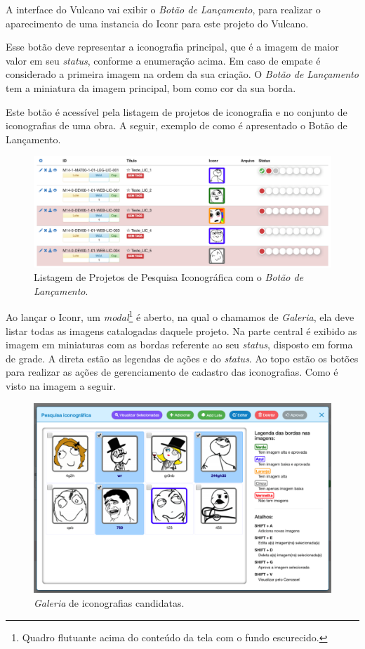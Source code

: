 \documentclass[
  12pt,				%
  openany,
  oneside,
  a4paper,			%
  english,			%
  brazil
]{article}
\numberwithin{figure}{section}
\numberwithin{table}{section}
\begin{document}
A interface do Vulcano vai exibir o \textit{Botão de Lançamento}, para realizar o aparecimento de uma instancia do Iconr para este projeto do Vulcano. 

Esse botão deve representar a iconografia principal, que é a imagem de maior valor em seu \textit{status}, conforme a enumeração acima. Em caso de empate é considerado a primeira imagem na ordem da sua criação. O \textit{Botão de Lançamento} tem a miniatura da imagem principal, bom como cor da sua borda.

Este botão é acessível pela listagem de projetos de iconografia e no conjunto de iconografias de uma obra. A seguir, exemplo de como é apresentado o Botão de Lançamento.

\begin{figure}[H]
	\centering
	\includegraphics[width=\linewidth]{iconr_launch_index}
	\vspace{-10mm}
	\caption{Listagem de Projetos de Pesquisa Iconográfica com o \textit{Botão de Lançamento}.}
	\label{fig:iconr:index}
\end{figure}

Ao lançar o Iconr, um \textit{modal}\footnote{Quadro flutuante acima do conteúdo da tela com o fundo escurecido.} é aberto, na qual o chamamos de \textit{Galeria}, ela deve listar todas as imagens catalogadas daquele projeto. Na parte central é exibido as imagem em miniaturas com as bordas referente ao seu \textit{status}, disposto em forma de grade. A direta estão as legendas de ações e do \textit{status}. Ao topo estão os botões para realizar as ações de gerenciamento de cadastro das iconografias. Como é visto na imagem a seguir.

\begin{figure}[H]
	\centering
	\includegraphics[width=0.9\linewidth]{iconr_gallery}
	\caption{\textit{Galeria} de iconografias candidatas.}
	\label{fig:iconr:gallery}
\end{figure}
\end{document}
